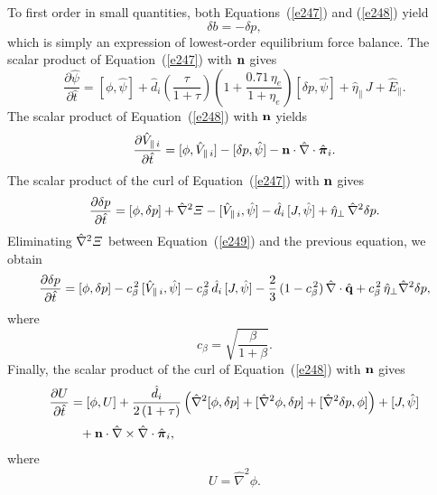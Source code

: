 \documentclass[notitlepage,12pt]{article}
\newcommand{\bpi}{\mbox{\boldmath$\pi$}}
\begin{document}
 To first order in small quantities, both Equations~(\ref{e247}) and (\ref{e248}) yield
 \begin{equation}
 \delta b =- \delta p,
 \end{equation}
 which is simply an expression of lowest-order equilibrium force balance. The scalar product of Equation~(\ref{e247}) with ${\bf n}$ gives
 \begin{equation}\label{e252}
 \frac{\partial\hat{\psi}}{\partial\hat{t}}= [\phi,\hat{\psi}] +\hat{d}_i\!\left(\frac{\tau}{1+\tau}\right)\left(1+\frac{0.71\,\eta_e}{1+\eta_e}\right)
 [\delta p,\hat{\psi}] + \hat{\eta}_\parallel\,J + \hat{E}_\parallel.
 \end{equation}
  The scalar product of Equation~(\ref{e248}) with ${\bf n}$ yields
 \begin{equation}\label{e254}
 \frac{\partial\hat{V}_{\parallel\,i}}{\partial\hat{t}}= [\phi,\hat{V}_{\parallel\,i}]-[\delta p,\hat{\psi}] -{\bf n}\cdot\hat{\nabla}\cdot\hat{\bpi}_i.
 \end{equation}
 The scalar product of the curl of Equation~(\ref{e247}) with ${\bf n}$ gives
 \begin{equation}
 \frac{\partial\delta p}{\partial\hat{t}}= [\phi,\delta p]+\hat{\nabla}^2{\mit\Xi}-[\hat{V}_{\parallel\,i},\hat{\psi}]
 -\hat{d}_i\,[J,\hat{\psi}] +\hat{\eta}_\perp\,\hat{\nabla}^{2}\delta p.
 \end{equation}
 Eliminating $\hat{\nabla}^2{\mit\Xi}$ between Equation~(\ref{e249}) and the previous equation, we obtain
 \begin{align}\label{e256}
 \frac{\partial\delta p}{\partial\hat{t}}= [\phi,\delta p]-c_\beta^{\,2}\,[\hat{V}_{\parallel\,i},\hat{\psi}]-c_\beta^{\,2}\,\hat{d}_i\,[J,\hat{\psi}]
 -\frac{2}{3}\,(1-c_\beta^{\,2})\,\hat{\nabla}\cdot\hat{\bf q} +c_\beta^{\,2}\,\hat{\eta}_\perp \hat{\nabla}^2\delta p,
 \end{align}
 where
 \begin{equation}\label{e257}
 c_\beta = \sqrt{\frac{\beta}{1+\beta}}.
 \end{equation}
 Finally, the scalar product of the curl of Equation~(\ref{e248}) with ${\bf n}$ gives 
 \begin{align}\label{e258}
 \frac{\partial U}{\partial\hat{t}}& = [\phi,U] + \frac{\hat{d}_i}{2\,(1+\tau)}\left(
 \hat{\nabla}^2[\phi,\delta p] + [\hat{\nabla}^2\phi,\delta p] + [\hat{\nabla}^2 \delta p,\phi]\right)
 + [J,\hat{\psi}] \nonumber\\[0.5ex]&\phantom{=} + {\bf n}\cdot\hat{\nabla}\times \hat{\nabla}\cdot\hat{\bpi}_i,
 \end{align}
 where 
 \begin{equation}
 U = \hat{\nabla}^{2}\phi.
 \end{equation}
 
\end{document}

